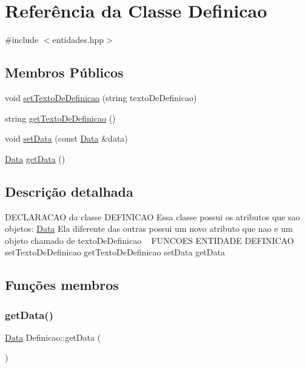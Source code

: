 \hypertarget{class_definicao}{}\section{Referência da Classe Definicao}
\label{class_definicao}


{\ttfamily \#include $<$entidades.\+hpp$>$}

\subsection*{Membros Públicos}
\begin{DoxyCompactItemize}
\item 
void \mbox{\hyperlink{class_definicao_a4c4f6ff99c330cde93a0ffb6500489ad}{set\+Texto\+De\+Definicao}} (string texto\+De\+Definicao)
\item 
string \mbox{\hyperlink{class_definicao_accdaa35b92e35e50f62b32265f28c49d}{get\+Texto\+De\+Definicao}} ()
\item 
void \mbox{\hyperlink{class_definicao_a3660abc2f1311be4b88011da6ada736e}{set\+Data}} (const \mbox{\hyperlink{class_data}{Data}} \&data)
\item 
\mbox{\hyperlink{class_data}{Data}} \mbox{\hyperlink{class_definicao_a7f0bbadaa7b23e40fb30c9ee94745c5f}{get\+Data}} ()
\end{DoxyCompactItemize}


\subsection{Descrição detalhada}
D\+E\+C\+L\+A\+R\+A\+C\+AO da classe D\+E\+F\+I\+N\+I\+C\+AO Essa classe possui os atributos que sao objetos\+: \mbox{\hyperlink{class_data}{Data}} Ela diferente das outras possui um novo atributo que nao e um objeto chamado de texto\+De\+Definicao ~\newline
F\+U\+N\+C\+O\+ES E\+N\+T\+I\+D\+A\+DE D\+E\+F\+I\+N\+I\+C\+AO set\+Texto\+De\+Definicao get\+Texto\+De\+Definicao set\+Data get\+Data 

\subsection{Funções membros}
\mbox{\label{class_definicao_a7f0bbadaa7b23e40fb30c9ee94745c5f}} 
\subsubsection{\texorpdfstring{get\+Data()}{getData()}}
{\footnotesize\ttfamily \mbox{\hyperlink{class_data}{Data}} Definicao\+::get\+Data (\begin{DoxyParamCaption}{ }\end{DoxyParamCaption})\hspace{0.3cm}{\ttfamily [inline]}}


